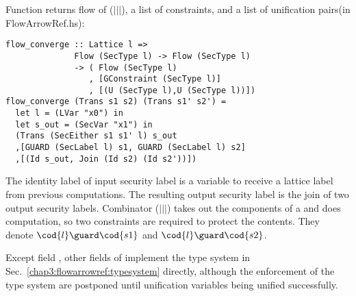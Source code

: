 Function  returns flow of ($|||$), a list of constraints, and a list of unification
pairs(in FlowArrowRef.hs):
\begin{verbatim}
flow_converge :: Lattice l => 
              Flow (SecType l) -> Flow (SecType l)
              -> ( Flow (SecType l)
                 , [GConstraint (SecType l)]
                 , [(U (SecType l),U (SecType l))])
flow_converge (Trans s1 s2) (Trans s1' s2') =
  let l = (LVar "x0") in
  let s_out = (SecVar "x1") in
  (Trans (SecEither s1 s1' l) s_out
  ,[GUARD (SecLabel l) s1, GUARD (SecLabel l) s2]
  ,[(Id s_out, Join (Id s2) (Id s2'))])
\end{verbatim}
The identity label of input security label  is a variable to receive a lattice label
from previous computations.
The resulting output security label is the join of two output security labels.
Combinator ($|||$) takes out the components of a  and does computation, 
so two  constraints are required to protect the contents. 
They denote $\cod{l}\guard \cod{s1}$ and $\cod{l}\guard \cod{s2}$.


Except field , other fields of  implement the type system 
in Sec.~\ref{chap3:flowarrowref:typesystem} directly, although the enforcement of the type system are 
postponed until unification variables being unified successfully.

